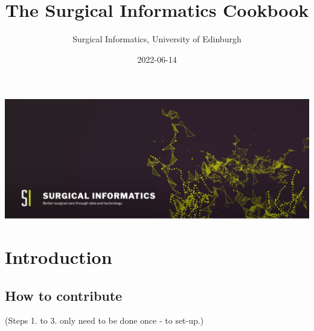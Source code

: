 \documentclass[
]{book}
\title{The Surgical Informatics Cookbook}
\author{Surgical Informatics, University of Edinburgh}
\date{2022-06-14}
\begin{document}
\maketitle

{
\setcounter{tocdepth}{1}
\tableofcontents
}
\hypertarget{section}{%
\chapter*{}\label{section}}

\includegraphics[width=30.97in]{img/surgical_informatics_minibanner}

\hypertarget{introduction}{%
\chapter{Introduction}\label{introduction}}

\hypertarget{how-to-contribute}{%
\section{How to contribute}\label{how-to-contribute}}

(Steps 1. to 3. only need to be done once - to set-up.)
\end{document}
